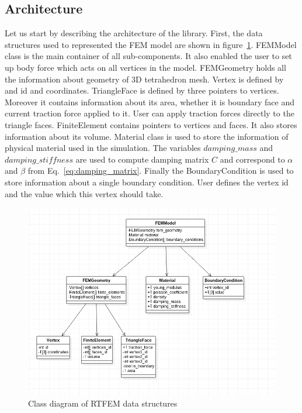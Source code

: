 \documentclass[en]{minipw} %
\begin{document}
\subsection{Architecture}
Let us start by describing the architecture of the library. First, the data structures used to represented the FEM model are shown in figure~\ref{fig:uml_fem_model}. FEMModel class is the main container of all sub-components. It also enabled the user to set up body force which acts on all vertices in the model. FEMGeometry holds all the information about geometry of 3D tetrahedron mesh. Vertex is defined by and id and coordinates. TriangleFace is defined by three pointers to vertices. Moreover it contains information about its area, whether it is boundary face and current traction force applied to it. User can apply traction forces directly to the triangle faces. FiniteElement contains pointers to vertices and faces. It also stores information about its volume. Material class is used to store the information of physical material used in the simulation. The variables $damping\_mass$ and $damping\_stiffness$ are used to compute damping matrix $C$ and correspond to $\alpha$ and $\beta$ from Eq.~\ref{eq:damping_matrix}. Finally the BoundaryCondition is used to store information about a single boundary condition. User defines the vertex id and the value which this vertex should take.

\begin{figure}[h!]
\centering
\includegraphics[scale=0.6]{pictures/fem_model.png}
\caption[Class diagram of RTFEM data structures]{Class diagram of RTFEM data structures}
\label{fig:uml_fem_model}
\end{figure}
\end{document}
